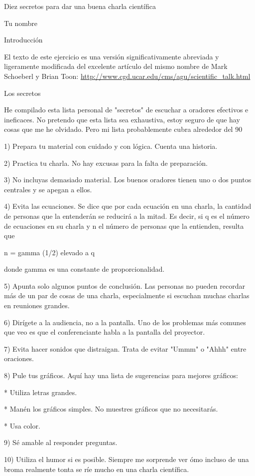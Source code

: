 \documentclass[12pt]{article}
\begin{document}
Diez secretos para dar una buena charla científica

Tu nombre

Introducción

El texto de este ejercicio es una versión significativamente abreviada y ligeramente modificada del excelente artículo del mismo nombre de Mark Schoeberl y Brian Toon: \url {http://www.cgd.ucar.edu/cms/agu/scientific_talk.html}

Los secretos

He compilado esta lista personal de "secretos" de escuchar a oradores efectivos e ineficaces. No pretendo que esta lista sea exhaustiva, estoy seguro de que hay cosas que me he olvidado. Pero mi lista probablemente cubra alrededor del 90%

1) Prepara tu material con cuidado y con lógica. Cuenta una historia.

2) Practica tu charla. No hay excusas para la falta de preparación.

3) No incluyas demasiado material. Los buenos oradores tienen uno o dos puntos centrales y se apegan a ellos.

4) Evita las ecuaciones. Se dice que por cada ecuación en una charla, la cantidad de personas que la entenderán se reducirá a la mitad. Es decir, si q es el número de ecuaciones en su charla y n el número de personas que la entienden, resulta que

n = gamma (1/2) elevado a q

donde gamma es una constante de proporcionalidad.

5) Apunta solo algunos puntos de conclusión. Las personas no pueden recordar más de un par de cosas de una charla, especialmente si escuchan muchas charlas en reuniones grandes.

6) Dirígete a la audiencia, no a la pantalla. Uno de los problemas más comunes que veo es que el conferenciante habla a la pantalla del proyector.

7) Evita hacer sonidos que distraigan. Trata de evitar "Ummm" o "Ahhh" entre oraciones.

8) Pule tus gráficos. Aquí hay una lista de sugerencias para mejores gráficos:

* Utiliza letras grandes.

* Manén los gráficos simples. No muestres gráficos que no necesitarás.

* Usa color.

9) Sé amable al responder preguntas.

10) Utiliza el humor si es posible. Siempre me sorprende ver ómo incluso de una broma realmente tonta se ríe mucho en una charla científica.
\end{document}
